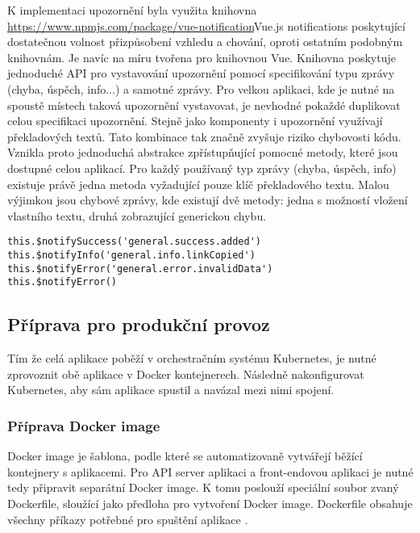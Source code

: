 
		K implementaci upozornění byla využita knihovna \url{https://www.npmjs.com/package/vue-notification}{Vue.js notifications}
		poskytující dostatečnou volnost přizpůsobení vzhledu a chování, oproti ostatním podobným knihovnám.
		Je navíc na míru tvořena pro knihovnou Vue.
		Knihovna poskytuje jednoduché \ac{API} pro vystavování upozornění pomocí specifikování typu zprávy (chyba, úspěch, info...) a
		samotné zprávy.
		Pro velkou aplikaci, kde je nutné na spoustě místech taková upozornění vystavovat, je nevhodné pokaždé duplikovat
		celou specifikaci upozornění.
		Stejně jako komponenty i upozornění využívají překladových textů.
		Tato kombinace tak značně zvyšuje riziko chybovosti kódu.
		Vznikla proto jednoduchá abstrakce zpřístupňující pomocné metody, které jsou dostupné celou aplikací.
		Pro každý používaný typ zprávy (chyba, úspěch, info) existuje právě jedna metoda vyžadující pouze klíč překladového textu.
		Malou výjimkou jsou chybové zprávy, kde existují dvě metody: jedna s možností vložení vlastního textu, druhá
		zobrazující generickou chybu.

		\begin{lstlisting}[caption={Implementované pomocné metody pro vystavení různých typů upozornění. Zdroj: [autor]}]
this.$notifySuccess('general.success.added')
this.$notifyInfo('general.info.linkCopied')
this.$notifyError('general.error.invalidData')
this.$notifyError()
		\end{lstlisting}

	\subsection{Příprava pro produkční provoz}

	Tím že celá aplikace poběží v orchestračním systému Kubernetes, je nutné zprovoznit obě aplikace v Docker kontejnerech.
	Následně nakonfigurovat Kubernetes, aby sám aplikace spustil a navázal mezi nimi spojení.

		\subsubsection{Příprava Docker image}

		Docker image je šablona, podle které se automatizovaně vytvářejí běžící kontejnery s aplikacemi.
		Pro \ac{API} server aplikaci a front-endovou aplikaci je nutné tedy připravit separátní Docker image.
		K tomu poslouží speciální soubor zvaný Dockerfile, sloužící jako předloha pro vytvoření Docker image.
		Dockerfile obsahuje všechny příkazy potřebné pro spuštění aplikace \cite{dockerfile_reference}.

